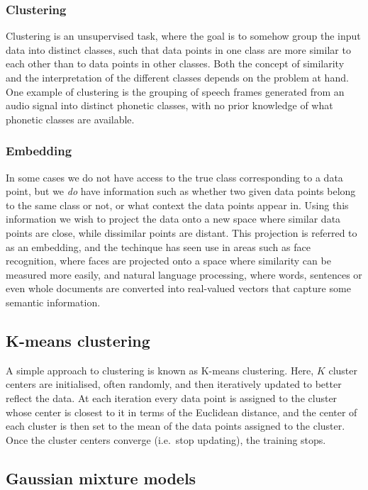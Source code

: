 \subsubsection{Clustering}

Clustering is an unsupervised task, where the goal is to somehow group the input data into distinct classes, such that data points in one class are more similar to each other than to data points in other classes.
Both the concept of similarity and the interpretation of the different classes depends on the problem at hand.
One example of clustering is the grouping of speech frames generated from an audio signal into distinct phonetic classes, with no prior knowledge of what phonetic classes are available.

\subsubsection{Embedding}

In some cases we do not have access to the true class corresponding to a data point, but we \emph{do} have information such as whether two given data points belong to the same class or not, or what context the data points appear in.
Using this information we wish to project the data onto a new space where similar data points are close, while dissimilar points are distant.
This projection is referred to as an embedding, and the techinque has seen use in areas such as face recognition, where faces are projected onto a space where similarity can be measured more easily, and natural language processing, where words, sentences or even whole documents are converted into real-valued vectors that capture some semantic information.

\subsection{K-means clustering}

A simple approach to clustering is known as K-means clustering.
Here, $K$ cluster centers are initialised, often randomly, and then iteratively updated to better reflect the data.
At each iteration every data point is assigned to the cluster whose center is closest to it in terms of the Euclidean distance, and the center of each cluster is then set to the mean of the data points assigned to the cluster.
Once the cluster centers converge (i.e.\ stop updating), the training stops.

\subsection{Gaussian mixture models}


